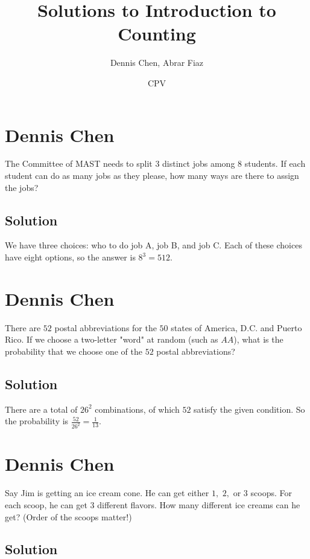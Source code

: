 \documentclass{article}
\title{Solutions to Introduction to Counting}
\author{Dennis Chen, Abrar Fiaz}
\date{CPV}
\begin{document}
\maketitle

\toc

\pagebreak\section{Dennis Chen}

The Committee of MAST needs to split $3$ distinct jobs among $8$ students. If each student can do as many jobs as they please, how many ways are there to assign the jobs?

\subsection{Solution}
We have three choices: who to do job A, job B, and job C. Each of these choices have eight options, so the answer is $8^3=512.$

\pagebreak\section{Dennis Chen}

There are $52$ postal abbreviations for the $50$ states of America, D.C. and Puerto Rico. If we choose a two-letter "word" at random (such as $AA$), what is the probability that we choose one of the $52$ postal abbreviations?
\subsection{Solution}

There are a total of $26^2$ combinations, of which $52$ satisfy the given condition. So the probability is $\frac{52}{26^2}=\frac{1}{13}.$

\pagebreak\section{Dennis Chen}

Say Jim is getting an ice cream cone. He can get either $1,$ $2,$ or $3$ scoops. For each scoop, he can get $3$ different flavors. How many different ice creams can he get? (Order of the scoops matter!)

\subsection{Solution}
\end{document}

